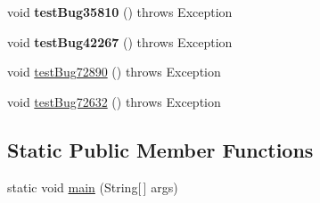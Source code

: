 \begin{DoxyCompactItemize}
\item 
\mbox{\label{classtestsuite_1_1regression_1_1_data_source_regression_test_a8decbce2b9442cfc9e96358e3b18f2a4}} 
void {\bfseries test\+Bug35810} ()  throws Exception 
\item 
\mbox{\label{classtestsuite_1_1regression_1_1_data_source_regression_test_a1245631ae5a6845eb5ddbb827815d8f4}} 
void {\bfseries test\+Bug42267} ()  throws Exception 
\item 
void \mbox{\hyperlink{classtestsuite_1_1regression_1_1_data_source_regression_test_ae91b4203179883e6c257ba0484c9974e}{test\+Bug72890}} ()  throws Exception 
\item 
void \mbox{\hyperlink{classtestsuite_1_1regression_1_1_data_source_regression_test_abba082ff766209732ff52f20bfe77cae}{test\+Bug72632}} ()  throws Exception 
\end{DoxyCompactItemize}
\subsection*{Static Public Member Functions}
\begin{DoxyCompactItemize}
\item 
static void \mbox{\hyperlink{classtestsuite_1_1regression_1_1_data_source_regression_test_a0d381bc3c72a7d395cb47e226208071d}{main}} (String\mbox{[}$\,$\mbox{]} args)
\end{DoxyCompactItemize}
